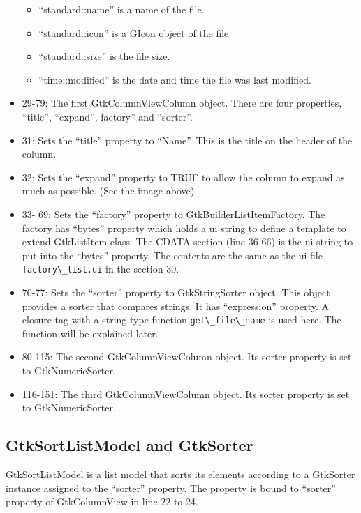 \begin{itemize}
  \begin{itemize}
  \tightlist
  \item
    ``standard::name'' is a name of the file.
  \item
    ``standard::icon'' is a GIcon object of the file
  \item
    ``standard::size'' is the file size.
  \item
    ``time::modified'' is the date and time the file was last modified.
  \end{itemize}
\item
  29-79: The first GtkColumnViewColumn object. There are four
  properties, ``title'', ``expand'', factory'' and ``sorter''.
\item
  31: Sets the ``title'' property to ``Name''. This is the title on the
  header of the column.
\item
  32: Sets the ``expand'' property to TRUE to allow the column to expand
  as much as possible. (See the image above).
\item
  33- 69: Sets the ``factory'' property to GtkBuilderListItemFactory.
  The factory has ``bytes'' property which holds a ui string to define a
  template to extend GtkListItem class. The CDATA section (line 36-66)
  is the ui string to put into the ``bytes'' property. The contents are
  the same as the ui file \passthrough{\lstinline!factory\_list.ui!} in
  the section 30.
\item
  70-77: Sets the ``sorter'' property to GtkStringSorter object. This
  object provides a sorter that compares strings. It has ``expression''
  property. A closure tag with a string type function
  \passthrough{\lstinline!get\_file\_name!} is used here. The function
  will be explained later.
\item
  80-115: The second GtkColumnViewColumn object. Its sorter property is
  set to GtkNumericSorter.
\item
  116-151: The third GtkColumnViewColumn object. Its sorter property is
  set to GtkNumericSorter.
\end{itemize}

\subsection{GtkSortListModel and
GtkSorter}\label{gtksortlistmodel-and-gtksorter}

GtkSortListModel is a list model that sorts its elements according to a
GtkSorter instance assigned to the ``sorter'' property. The property is
bound to ``sorter'' property of GtkColumnView in line 22 to 24.

